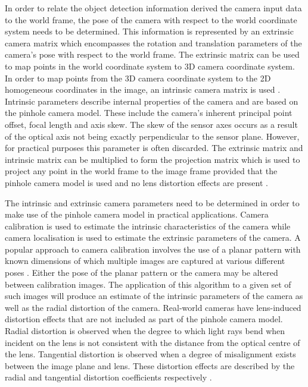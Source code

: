 In order to relate the object detection information derived the camera input data to the world frame, the pose of the camera with respect to the world coordinate system needs to be determined. This information is represented by an extrinsic camera matrix which encompasses the rotation and translation parameters of the camera's pose with respect to the world frame. The extrinsic matrix can be used to map points in the world coordinate system to 3D camera coordinate system. In order to map points from the 3D camera coordinate system to the 2D homogeneous coordinates in the image, an intrinsic camera matrix is used \cite{Szeliski:Computer_Vision_Algorithms_and_Applications}. Intrinsic parameters describe internal properties of the camera and are based on the pinhole camera model. These include the camera's inherent principal point offset, focal length and axis skew. The skew of the sensor axes occurs as a result of the optical axis not being exactly perpendicular to the sensor plane. However, for practical purposes this parameter is often discarded. The extrinsic matrix and intrinsic matrix can be multiplied to form the projection matrix which is used to project any point in the world frame to the image frame provided that the pinhole camera model is used and no lens distortion effects are present \cite{OpenCV:Camera_Calibration}.

The intrinsic and extrinsic camera parameters need to be determined in order to make use of the pinhole camera model in practical applications. Camera calibration is used to estimate the intrinsic characteristics of the camera while camera localisation is used to estimate the extrinsic parameters of the camera. A popular approach to camera calibration involves the use of a planar pattern with known dimensions of which multiple images are captured at various different poses \cite{Zhang:A_Flexible_Camera_Calibration_Technique}. Either the pose of the planar pattern or the camera may be altered between calibration images. The application of this algorithm to a given set of such images will produce an estimate of the intrinsic parameters of the camera as well as the radial distortion of the camera. Real-world cameras have lens-induced distortion effects that are not included as part of the pinhole camera model. Radial distortion is observed when the degree to which light rays bend when incident on the lens is not consistent with the distance from the optical centre of the lens. Tangential distortion is observed when a degree of misalignment exists between the image plane and lens. These distortion effects are described by the radial and tangential distortion coefficients respectively \cite{MathWorks:Camera_Calibration}.

